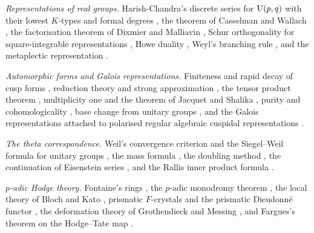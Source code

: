 \emph{Representations of real groups.} Harish-Chandra's discrete series for $\mathrm{U}(p,q)$ with
their lowest $K$-types and formal degrees
\cite{harishchandra1965discrete,harishchandra1966discrete,schmid1975some}, the theorem of
Casselman and Wallach \cite{casselman1989canonical,wallach1983asymptotic}, the factorisation
theorem of Dixmier and Malliavin \cite{dixmier1978factorisations}, Schur orthogonality for
square-integrable representations \cite{godement1947orthogonalite}, Howe duality
\cite{howe1989remarks,howe1989transcending}, Weyl's branching rule \cite{weyl1946classical},
and the metaplectic representation \cite{weil1964certains,shale1962linear}.

\emph{Automorphic forms and Galois representations.} Finiteness and rapid decay of cusp forms
\cite{harishchandra1968automorphic,gelfand1969representation,moeglin1994decomposition},
reduction theory and strong approximation
\cite{borel1962arithmetic,kneser1965starke,platonov1969problem}, the tensor product theorem
\cite{flath1979decomposition}, multiplicity one and the theorem of Jacquet and Shalika
\cite{shalika1974multiplicity,piatetskishapiro1979multiplicity,jacquet1981eulerI,jacquet1981eulerII},
purity and cohomologicality \cite{clozel1990motifs}, base change from unitary groups
\cite{labesse2011changement}, and the Galois representations attached to polarised regular
algebraic cuspidal representations
\cite{shin2011galois,chenevier2013construction,caraiani2012local}.

\emph{The theta correspondence.} Weil's convergence criterion and the Siegel--Weil formula for
unitary groups \cite{weil1965formule,ichino2007siegel,yamana2011siegel,ikeda1996residue}, the
mass formula \cite{siegel1935analytische,braun1941theorie}, the doubling method
\cite{piatetskishapiro1987lfunctions,gelbart1987explicit}, the continuation of Eisenstein
series \cite{langlands1976functional,bernstein2024meromorphic}, and the Rallis inner product
formula \cite{rallis1984injectivity,li1992nonvanishing}.

\emph{$p$-adic Hodge theory.} Fontaine's rings
\cite{fontaine1982certains,fontaine1994corps,fontaine1994semistables}, the $p$-adic monodromy
theorem \cite{berger2002representations,andre2002filtrations,mebkhout2002analogue,kedlaya2004padic}, the local
theory of Bloch and Kato \cite{bloch1990lfunctions}, prismatic $F$-crystals and the prismatic
Dieudonn\'e functor \cite{bhatt2023prismatic,anschutz2023prismatic}, the deformation theory of
Grothendieck and Messing \cite{messing1972crystals,mazur1974universal}, and Fargues's theorem on
the Hodge--Tate map \cite{fargues2008isomorphisme,tate1967pdivisible}.


